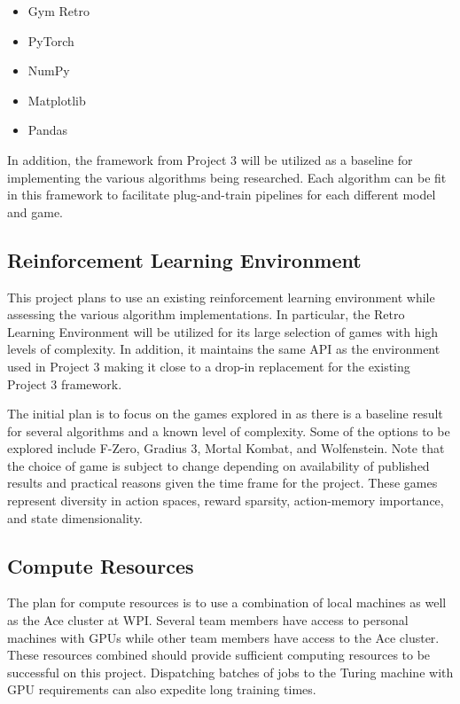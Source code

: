 \documentclass[conference]{IEEEtran}
\begin{document}
\begin{itemize}
    \item Gym Retro \cite{nichol2018retro}
    \item PyTorch
    \item NumPy
    \item Matplotlib
    \item Pandas
\end{itemize}

In addition, the framework from Project 3 will be utilized as a baseline for implementing the various algorithms being researched. Each algorithm can be fit in this framework to facilitate plug-and-train pipelines for each different model and game.

\subsection{Reinforcement Learning Environment}
This project plans to use an existing reinforcement learning environment while assessing the various algorithm implementations.
In particular, the Retro Learning Environment \cite{nichol2018retro} will be utilized for its large selection of games with high levels of complexity.
In addition, it maintains the same API as the environment used in Project 3 making it close to a drop-in replacement for the existing Project 3 framework.

The initial plan is to focus on the games explored in \cite{bhonker2017playing} as there is a baseline result for several algorithms and a known level of complexity.
Some of the options to be explored include F-Zero, Gradius 3, Mortal Kombat, and Wolfenstein.
Note that the choice of game is subject to change depending on availability of published results and practical reasons given the time frame for the project.
These games represent diversity in action spaces, reward sparsity, action-memory importance, and state dimensionality.

\subsection{Compute Resources}
The plan for compute resources is to use a combination of local machines as well as the Ace cluster at WPI.
Several team members have access to personal machines with GPUs while other team members have access to the Ace cluster.
These resources combined should provide sufficient computing resources to be successful on this project.
Dispatching batches of jobs to the Turing machine with GPU requirements can also expedite long training times.
\end{document}
